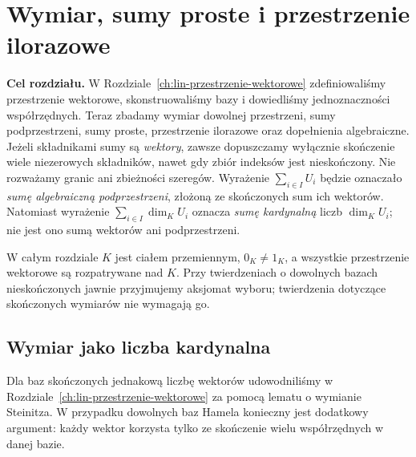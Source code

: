 \chapter{Wymiar, sumy proste i przestrzenie ilorazowe}
\label{ch:lin2-wymiar-sumy-ilorazy}

\providecommand{\atlasref}[2]{#2}


\noindent\textbf{Cel rozdziału.}
W Rozdziale~\ref{ch:lin-przestrzenie-wektorowe} zdefiniowaliśmy przestrzenie
wektorowe, skonstruowaliśmy bazy i dowiedliśmy jednoznaczności współrzędnych.
Teraz zbadamy wymiar dowolnej przestrzeni, sumy podprzestrzeni, sumy proste,
przestrzenie ilorazowe oraz dopełnienia algebraiczne.
Jeżeli składnikami sumy są \emph{wektory}, zawsze dopuszczamy
wyłącznie skończenie wiele niezerowych składników, nawet gdy zbiór
indeksów jest nieskończony. Nie rozważamy granic ani zbieżności
szeregów. Wyrażenie \(\sum_{i\in I}U_i\) będzie oznaczało
\emph{sumę algebraiczną podprzestrzeni}, złożoną
ze skończonych sum ich wektorów.
Natomiast wyrażenie \(\sum_{i\in I}\dim_KU_i\)
oznacza \emph{sumę kardynalną} liczb \(\dim_KU_i\);
nie jest ono sumą wektorów ani podprzestrzeni.

W całym rozdziale \(K\) jest ciałem przemiennym, \(0_K\neq1_K\),
a wszystkie przestrzenie wektorowe są rozpatrywane nad \(K\).
Przy twierdzeniach o dowolnych bazach nieskończonych
jawnie przyjmujemy aksjomat wyboru; twierdzenia dotyczące skończonych
wymiarów nie wymagają go.

\section{Wymiar jako liczba kardynalna}
\label{sec:lin2-wymiar-kardynalny}

Dla baz skończonych jednakową liczbę wektorów
udowodniliśmy w Rozdziale~\ref{ch:lin-przestrzenie-wektorowe}
za pomocą lematu o wymianie Steinitza.
W przypadku dowolnych baz Hamela konieczny jest dodatkowy argument:
każdy wektor korzysta tylko ze skończenie wielu współrzędnych
w danej bazie.

